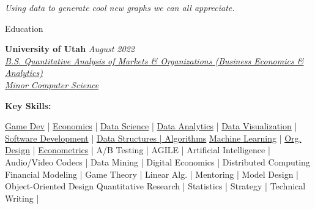\documentclass{resume/resume}
\begin{document}

\begin{center}
 \vspace{-1em}
 {\em
    Using data to generate cool new graphs we can all appreciate.
 }
 \vspace{-10pt}
\end{center}


\begin{rSection}{Education}

{\bf University of Utah} \hfill {\em August 2022}
\vspace{2pt}
\emph{
    \\ \href{https://eccles.utah.edu/programs/undergraduate/academics/majors/qamo/}{B.S. Quantitative Analysis of Markets \& Organizations (Business Economics \& Analytics)}
    \\ \href{https://github.com/search?o=desc&q=user\%3ASpelkington&s=updated&type=Repositories}{Minor Computer Science}
}


{\bf Key Skills:}
\vspace{-1.83em}

\begin{adjustwidth}{6em}{0pt}
    \href{https://spelkington.github.io/Because-I-Cannot-Draw/}{Game Dev} |  %
    \href{https://www.youtube.com/watch?v=lMFQp3wN-cg}{Economics} |  %
    \href{https://github.com/Spelkington/mlearning}{Data Science} |  %
    \href{https://github.com/UtahTriangle/Laws/blob/main/Proposals/NationalsHelp/figures/distances.pdf}{Data Analytics} |  %
    \href{https://spelkington.github.io/assets/utah_office_update.pdf}{Data Visualization} |  %
    \href{https://github.com/spelkington}{Software Development} |
    \href{https://www.youtube.com/watch?v=lMFQp3wN-cg}{Data Structures | Algorithms}
    \href{https://github.com/Spelkington/mlearning}{Machine Learning} |  %
    \href{https://spelkington.github.io/assets/utah_office_update.pdf}{Org. Design} |  %
    \href{https://github.com/Spelkington/econometrics}{Econometrics} |  %
    A/B Testing | 
    AGILE | 
    Artificial Intelligence | 
    Audio/Video Codecs | 
    Data Mining | 
    Digital Economics | 
    Distributed Computing
    Financial Modeling |
    Game Theory | 
    Linear Alg. | 
    Mentoring |
    Model Design | 
    Object-Oriented Design
    Quantitative Research |
    Statistics |
    Strategy |
    Technical Writing |
    

\end{adjustwidth}
\end{rSection}
\end{document}
